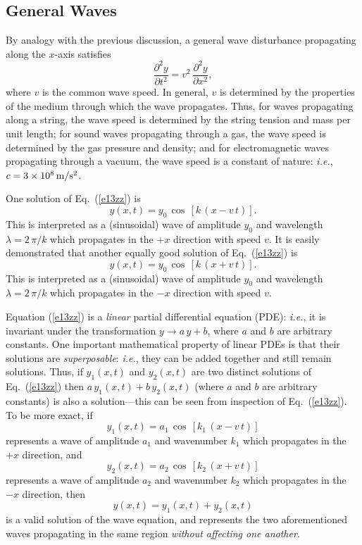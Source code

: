 \subsection{General Waves}
By analogy with the previous discussion, a general wave disturbance propagating
along the $x$-axis satisfies
\begin{equation}\label{e13zz}
\frac{\partial^2 y}{\partial t^2}=v^2\,\frac{\partial^2 y}{\partial x^2},
\end{equation}
where $v$ is the common wave speed. In general, $v$ is determined by the properties of
the  medium through which the wave propagates. Thus, for waves propagating along a string, the wave
speed is determined by the string tension and mass per unit length; for
sound waves propagating through a gas, the wave speed is determined by the
gas pressure and density; and for electromagnetic waves propagating through
a vacuum, the wave speed is a constant of nature: {\em i.e.}, $c=3\times 10^8\,{\rm m}/{\rm s}^2$.

One solution of Eq.~(\ref{e13zz}) is
\begin{equation}
y(x,t) = y_0\,\cos\,[k\,(x - v\,t)].
\end{equation}
This is interpreted as a (sinusoidal) wave of amplitude $y_0$ and wavelength $\lambda=2\,\pi/k$ which
propagates in the $+x$ direction with speed $v$. It is easily demonstrated that another
equally good solution of Eq.~(\ref{e13zz}) is
\begin{equation}
y(x,t) = y_0\,\cos\,[k\,(x + v\,t)].
\end{equation}
This is interpreted as a (sinusoidal) wave of amplitude $y_0$ and wavelength $\lambda=2\,\pi/k$ which
propagates in the $-x$ direction with speed $v$.

Equation (\ref{e13zz}) is a {\em linear} partial differential equation (PDE): {\em i.e.}, it is invariant under the transformation
$y\rightarrow a\,y + b$, where $a$ and $b$ are arbitrary constants. One important mathematical
property of linear PDEs is that their solutions are {\em superposable}: {\em i.e.}, they can be added
together and still remain solutions. Thus,  if $y_1(x,t)$ and $y_2(x,t)$ are two distinct solutions
 of Eq.~(\ref{e13zz}) then $a\,y_1(x,t) + b\,y_2(x,t)$ (where $a$ and $b$ are arbitrary constants)
is also a solution---this can be seen from inspection of Eq.~(\ref{e13zz}). To be
more exact, if
\begin{equation}
y_1(x,t) = a_1\,\cos\,[k_1\,(x - v\,t)]
\end{equation}
represents a wave of amplitude $a_1$ and wavenumber $k_1$ which propagates in the
$+x$ direction, and
\begin{equation}
y_2(x,t) = a_2\,\cos\,[k_2\,(x + v\,t)]
\end{equation}
represents a wave of amplitude $a_2$ and wavenumber $k_2$ which propagates in the
$-x$ direction, then
\begin{equation}
y(x,t) = y_1(x,t) + y_2(x,t)
\end{equation}
is a valid solution of the wave equation, and represents the two aforementioned waves 
propagating in the same region {\em without affecting one another}.

